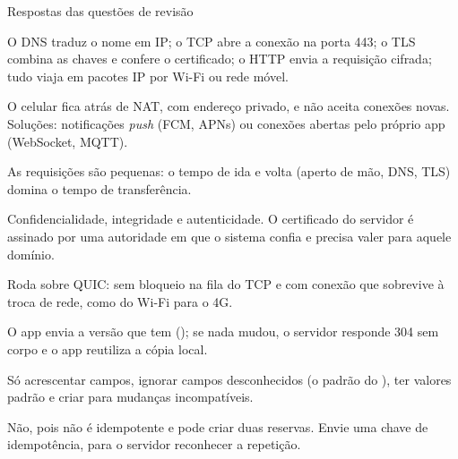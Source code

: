 \documentclass[aspectratio=169,10pt]{beamer}
\begin{document}
\begin{frame}{Respostas das questões de revisão}
  \begin{respostas}
    \item O DNS traduz o nome em IP; o TCP abre a conexão na porta 443; o TLS combina as chaves e confere o certificado; o HTTP envia a requisição cifrada; tudo viaja em pacotes IP por Wi-Fi ou rede móvel.
    \item O celular fica atrás de NAT, com endereço privado, e não aceita conexões novas. Soluções: notificações \emph{push} (FCM, APNs) ou conexões abertas pelo próprio app (WebSocket, MQTT).
    \item As requisições são pequenas: o tempo de ida e volta (aperto de mão, DNS, TLS) domina o tempo de transferência.
    \item Confidencialidade, integridade e autenticidade. O certificado do servidor é assinado por uma autoridade em que o sistema confia e precisa valer para aquele domínio.
    \item Roda sobre QUIC: sem bloqueio na fila do TCP e com conexão que sobrevive à troca de rede, como do Wi-Fi para o 4G.
    \item O app envia a versão que tem (); se nada mudou, o servidor responde 304 sem corpo e o app reutiliza a cópia local.
    \item Só acrescentar campos, ignorar campos desconhecidos (o padrão do ), ter valores padrão e criar  para mudanças incompatíveis.
    \item Não, pois  não é idempotente e pode criar duas reservas. Envie uma chave de idempotência, para o servidor reconhecer a repetição.
  \end{respostas}
\end{frame}

\end{document}
